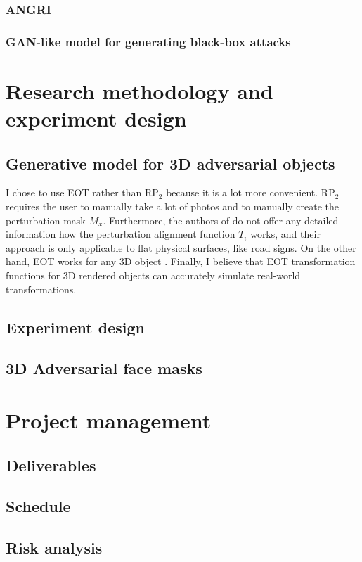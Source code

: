 \documentclass[11pt, a4paper, oneside]{article}
\begin{document}
\subsubsection{ANGRI}

\subsubsection{GAN-like model for generating black-box attacks}

\section{Research methodology and experiment design}

\subsection{Generative model for 3D adversarial objects}

I chose to use EOT \cite{athalye} rather than $\textrm{RP}_2$ \cite{evtimov_road_signs} because it is a lot more convenient. $\textrm{RP}_2$ requires the user to manually take a lot of photos and to manually create the perturbation mask $M_x$. Furthermore, the authors of \cite{evtimov_road_signs} do not offer any detailed information how the perturbation alignment function $T_i$ works, and their approach is only applicable to flat physical surfaces, like road signs. On the other hand, EOT works for any 3D object \cite{athalye}. Finally, I believe that EOT transformation functions for 3D rendered objects can accurately simulate real-world transformations.

\subsection{Experiment design}

\subsection{3D Adversarial face masks}
    \label{subsec:face_masks}
    
\section{Project management}

\subsection{Deliverables}

\subsection{Schedule}

\subsection{Risk analysis}

\clearpage
\printbibliography
\end{document}
